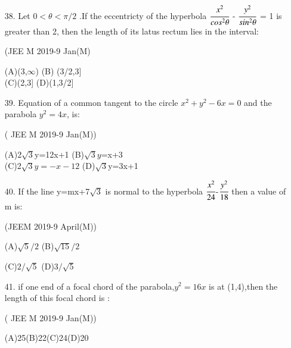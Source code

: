 \documentclass[journal,12pt,twocolumn]{IEEEtran}
\theoremstyle{remark}
\begin{document}
\begin{enumerate}
\item[38.] Let 0$<$$\theta$$<$$\pi/2$  .If the eccentricty of the hyperbola $\cfrac{x^2}{cos^2\theta}$ - $\cfrac{y^2}{sin^2\theta}$ = 1 is greater than 2, then the length of its latus rectum lies in the interval:

    \hfill{(JEE M 2019-9 Jan(M)}

    (A)(3,$\infty$) \hspace{2cm} (B) (3/2,3]\\

    (C)(2,3]  \hspace{2cm}   (D)(1,3/2]\\

\item[39.] Equation of a common tangent to the circle $x^2+y^2-6x=0$ and the parabola $y^2=4x$, is:

    \hfill{( JEE M 2019-9 Jan(M))}

   (A)2$\sqrt{3}$y=12x+1 \hspace{2cm} (B)$\sqrt{3}y$=x+3\\

   (C)2$\sqrt{3}y=-x-12$  \hspace{2cm}  (D)$\sqrt{3}$y=3x+1\\

\item[40.] If the line y=mx+7$\sqrt{3}$ is normal to the hyperbola $\cfrac{x^2}{24}$-$\cfrac{y^2}{18}$ then a value of m is: 

   \hfill{(JEEM 2019-9 April(M))}

  (A)$\sqrt{5}/2$ \hspace{2cm}  (B)$\sqrt{15}/2$

  (C)$2/\sqrt5$ \hspace{2cm}    (D)$3/\sqrt{5}$

\item[41.] if one end of a focal chord of the parabola,$y^2=16x$ is at (1,4),then the length of this focal chord is :

      \hfill{( JEE M 2019-9 Jan(M))}

   (A)25\hspace{1cm}(B)22\hspace{1cm}(C)24\hspace{1cm}(D)20

    
    
     
     
  \end{enumerate}
\end{document}
